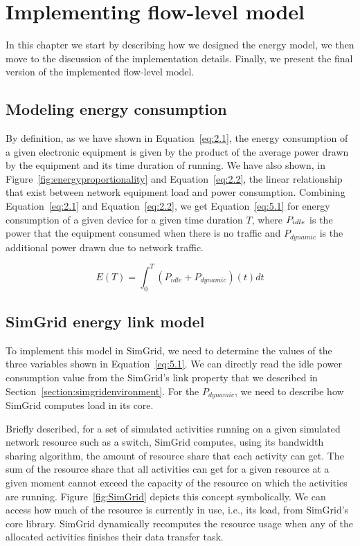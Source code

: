 \chapter{Implementing flow-level model}
\label{chapter:implementation}

In this chapter we start by describing how we designed the energy model, we then move to the discussion of the implementation details. Finally, we present the final version of the implemented flow-level model. 


\section{Modeling energy consumption}
By definition, as we have shown in Equation~\ref{eq:2.1}, the energy consumption of a given electronic equipment is given by the product of the average power drawn by the equipment and its time duration of running. We have also shown, in Figure~\ref{fig:energyproportionality} and Equation~\ref{eq:2.2}, the linear relationship that exist between network equipment load and power consumption. Combining Equation~\ref{eq:2.1} and Equation~\ref{eq:2.2}, we get Equation~\ref{eq:5.1} for energy consumption of a given device for a given time duration $T$, where \($$P_{idle}$$\) is the power that the equipment consumed when there is no traffic and \(P_{dynamic}\) is the additional power drawn due to network traffic.

\begin{equation} \label{eq:5.1}
E(T) =  \int_{0}^{T} (P_{idle} + P_{dynamic})(t) dt 
\end{equation} 


\section{SimGrid energy link model}
To implement this model in SimGrid, we need to determine the values of the three variables shown in Equation~\ref{eq:5.1}. We can directly read the idle power consumption value from the SimGrid's link property that we described in Section~\ref{section:simgridenvironment}. For the \(P_{dynamic}\), we need to describe how SimGrid computes load in its core. 

Briefly described, for a set of simulated activities running on a given simulated network resource such as a switch, SimGrid computes, using its bandwidth sharing algorithm, the amount of resource share that each activity can get. The sum of the resource share that all activities can get for a given resource at a given moment cannot exceed the capacity of the resource on which the activities are running. Figure~\ref{fig:SimGrid} depicts this concept symbolically. We can access how much of the resource is currently in use, i.e., its load, from SimGrid's core library. SimGrid dynamically recomputes the resource usage when any of the allocated activities finishes their data transfer task. 

